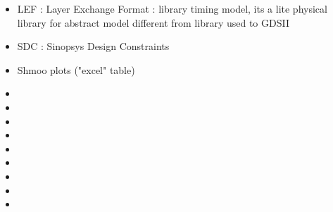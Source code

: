 \documentclass[11pt,a4paper,sans]{report}
\begin{document}
\begin{itemize}
	\item LEF : Layer Exchange Format : library timing model, its a lite physical library for abstract model different from library used to GDSII
	\item SDC : Sinopsys Design Constraints
	\item Shmoo plots ("excel" table)
	\item 
	\item 
	\item 
	\item 
	\item 
	\item 
	\item 
	\item 
	\item 
	
\end{itemize}
\end{document}
